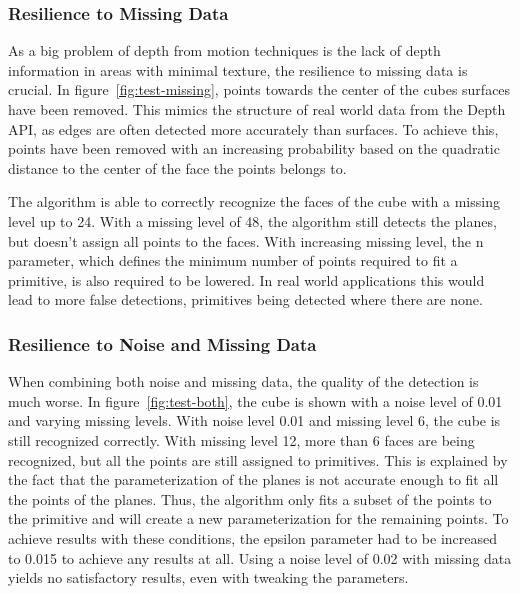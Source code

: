 \subsubsection{Resilience to Missing Data}

As a big problem of depth from motion techniques is the lack of depth information in areas with minimal texture,
the resilience to missing data is crucial.
In figure~\ref{fig:test-missing}, points towards the center of the cubes surfaces have been removed.
This mimics the structure of real world data from the Depth API,
as edges are often detected more accurately than surfaces.
To achieve this, points have been removed with an increasing probability based on the
quadratic distance to the center of the face the points belongs to.

The algorithm is able to correctly recognize the faces of the cube with a missing level up to 24.
With a missing level of 48, the algorithm still detects the planes, but doesn't assign all points to the faces.
With increasing missing level, the n parameter, which defines the minimum number of points required to fit a primitive,
is also required to be lowered.
In real world applications this would lead to more false detections, primitives being detected where there are none.

%
%


\subsubsection{Resilience to Noise and Missing Data}

When combining both noise and missing data, the quality of the detection is much worse.
In figure~\ref{fig:test-both}, the cube is shown with a noise level of 0.01 and varying missing levels.
With noise level 0.01 and missing level 6, the cube is still recognized correctly.
With missing level 12, more than 6 faces are being recognized, but all the points are still assigned to primitives.
This is explained by the fact that the parameterization of the planes is not accurate enough to fit all the points of the planes.
Thus, the algorithm only fits a subset of the points to the primitive and will create a new parameterization
for the remaining points.
To achieve results with these conditions, the epsilon parameter had to be increased to 0.015 to achieve any results at all.
Using a noise level of 0.02 with missing data yields no satisfactory results, even with tweaking the parameters.

